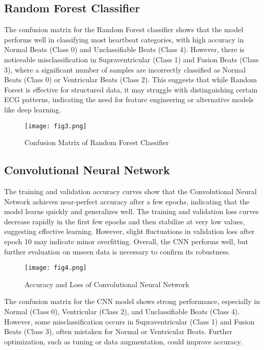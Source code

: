 \documentclass[11pt,a4paper,twoside]{article}
\begin{document}
\subsection{Random Forest Classifier}
The confusion matrix for the Random Forest classifier shows that the model performs well in classifying most heartbeat categories, with high accuracy in Normal Beats (Class 0) and Unclassifiable Beats (Class 4). However, there is noticeable misclassification in Supraventricular (Class 1) and Fusion Beats (Class 3), where a significant number of samples are incorrectly classified as Normal Beats (Class 0) or Ventricular Beats (Class 2). This suggests that while Random Forest is effective for structured data, it may struggle with distinguishing certain ECG patterns, indicating the need for feature engineering or alternative models like deep learning.

\begin{figure}[!h]
	\centering
	\texttt{[image: fig3.png]}
	\caption{Confusion Matrix of Random Forest Classifier}
	\label{f3}
\end{figure}


\subsection{Convolutional Neural Network}
The training and validation accuracy curves show that the Convolutional Neural Network achieves near-perfect accuracy after a few epochs, indicating that the model learns quickly and generalizes well. The training and validation loss curves decrease rapidly in the first few epochs and then stabilize at very low values, suggesting effective learning. However, slight fluctuations in validation loss after epoch 10 may indicate minor overfitting. Overall, the CNN performs well, but further evaluation on unseen data is necessary to confirm its robustness.


\begin{figure}[!h]
	\centering
	\texttt{[image: fig4.png]}
	\caption{Accuracy and Loss of Convolutional Neural Network}
	\label{f4}
\end{figure}


The confusion matrix for the CNN model shows strong performance, especially in Normal (Class 0), Ventricular (Class 2), and Unclassifiable Beats (Class 4). However, some misclassification occurs in Supraventricular (Class 1) and Fusion Beats (Class 3), often mistaken for Normal or Ventricular Beats. Further optimization, such as tuning or data augmentation, could improve accuracy.
\end{document}
